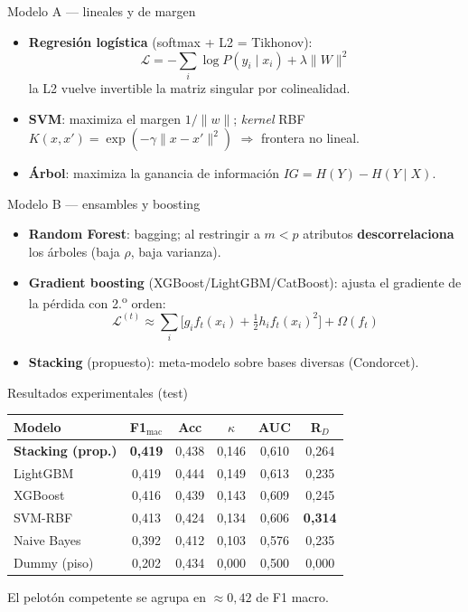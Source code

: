 \documentclass[aspectratio=169]{beamer}
\begin{document}
\begin{frame}{Modelo A --- lineales y de margen}
  \begin{itemize}
    \item \textbf{Regresión logística} (softmax + L2 = Tikhonov):
    \[ \mathcal{L}=-\sum_i\log P(y_i\mid x_i)+\lambda\lVert W\rVert^2 \]
    la L2 vuelve invertible la matriz singular por colinealidad.
    \item \textbf{SVM}: maximiza el margen $1/\lVert w\rVert$; \emph{kernel} RBF
    $K(x,x')=\exp(-\gamma\lVert x-x'\rVert^2)$ $\Rightarrow$ frontera no lineal.
    \item \textbf{Árbol}: maximiza la ganancia de información $IG=H(Y)-H(Y\mid X)$.
  \end{itemize}
\end{frame}

\begin{frame}{Modelo B --- ensambles y boosting}
  \begin{itemize}
    \item \textbf{Random Forest}: bagging; al restringir a $m<p$ atributos
    \textbf{descorrelaciona} los árboles (baja $\rho$, baja varianza).
    \item \textbf{Gradient boosting} (XGBoost/LightGBM/CatBoost): ajusta el gradiente de la
    pérdida con 2.\textsuperscript{o} orden:
    \[ \mathcal{L}^{(t)}\!\approx\!\sum_i\big[g_i f_t(x_i)+\tfrac12 h_i f_t(x_i)^2\big]+\Omega(f_t) \]
    \item \textbf{Stacking} (propuesto): meta-modelo sobre bases diversas
    (Condorcet).
  \end{itemize}
\end{frame}

\begin{frame}{Resultados experimentales (test)}
  \small
  \begin{table}
  \begin{tabular}{@{}lccccc@{}}
    \toprule
    Modelo & F1$_\text{mac}$ & Acc & $\kappa$ & AUC & R$_D$ \\
    \midrule
    \textbf{Stacking (prop.)} & \textbf{0,419} & 0,438 & 0,146 & 0,610 & 0,264 \\
    LightGBM       & 0,419 & 0,444 & 0,149 & 0,613 & 0,235 \\
    XGBoost        & 0,416 & 0,439 & 0,143 & 0,609 & 0,245 \\
    SVM-RBF        & 0,413 & 0,424 & 0,134 & 0,606 & \textbf{0,314} \\
    Naive Bayes    & 0,392 & 0,412 & 0,103 & 0,576 & 0,235 \\
    Dummy (piso)   & 0,202 & 0,434 & 0,000 & 0,500 & 0,000 \\
    \bottomrule
  \end{tabular}
  \end{table}
  \centering El pelotón competente se agrupa en $\approx 0{,}42$ de F1 macro.
\end{frame}
\end{document}
